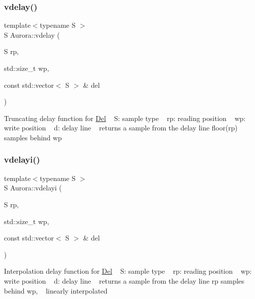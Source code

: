 \subsubsection{\texorpdfstring{vdelay()}{vdelay()}}
{\footnotesize\ttfamily template$<$typename S $>$ \\
S Aurora\+::vdelay (\begin{DoxyParamCaption}\item[{S}]{rp,  }\item[{std\+::size\+\_\+t}]{wp,  }\item[{const std\+::vector$<$ S $>$ \&}]{del }\end{DoxyParamCaption})}

Truncating delay function for \hyperlink{class_aurora_1_1_del}{Del} ~\newline
S\+: sample type ~\newline
rp\+: reading position ~\newline
wp\+: write position ~\newline
d\+: delay line ~\newline
returns a sample from the delay line floor(rp) samples behind wp \mbox{\label{namespace_aurora_a5318ddb492590ada5dc40ba80bbf655b}} 
\subsubsection{\texorpdfstring{vdelayi()}{vdelayi()}}
{\footnotesize\ttfamily template$<$typename S $>$ \\
S Aurora\+::vdelayi (\begin{DoxyParamCaption}\item[{S}]{rp,  }\item[{std\+::size\+\_\+t}]{wp,  }\item[{const std\+::vector$<$ S $>$ \&}]{del }\end{DoxyParamCaption})}

Interpolation delay function for \hyperlink{class_aurora_1_1_del}{Del} ~\newline
S\+: sample type ~\newline
rp\+: reading position ~\newline
wp\+: write position ~\newline
d\+: delay line ~\newline
returns a sample from the delay line rp samples behind wp, ~\newline
linearly interpolated 

